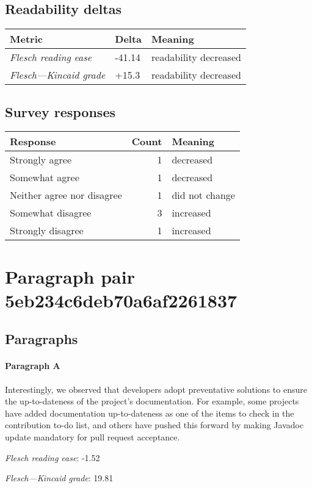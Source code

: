 \subsection{Readability deltas}

\begin{tabular}{lll}
\toprule
               \textbf{Metric} & \textbf{Delta} &       \textbf{Meaning} \\
\midrule
    \emph{Flesch reading ease} &         -41.14 &  readability decreased \\
 \emph{Flesch---Kincaid grade} &          +15.3 &  readability decreased \\
\bottomrule
\end{tabular}

\subsection{Survey responses}
\begin{tabular}{lrl}
\toprule
          \textbf{Response} &  \textbf{Count} & \textbf{Meaning} \\
\midrule
             Strongly agree &               1 &        decreased \\
             Somewhat agree &               1 &        decreased \\
 Neither agree nor disagree &               1 &   did not change \\
          Somewhat disagree &               3 &        increased \\
          Strongly disagree &               1 &        increased \\
\bottomrule
\end{tabular}

\section{Paragraph pair 5eb234c6deb70a6af2261837}
\subsection{Paragraphs}
\paragraph{Paragraph A}
Interestingly, we observed that developers adopt preventative solutions to ensure the up-to-dateness of the project's documentation. For example, some projects have added documentation up-to-dateness as one of the items to check in the contribution to-do list, and others have pushed this forward by making Javadoc update mandatory for pull request acceptance.\par\medskip
\emph{Flesch reading ease}: -1.52\par
\emph{Flesch---Kincaid grade}: 19.81

